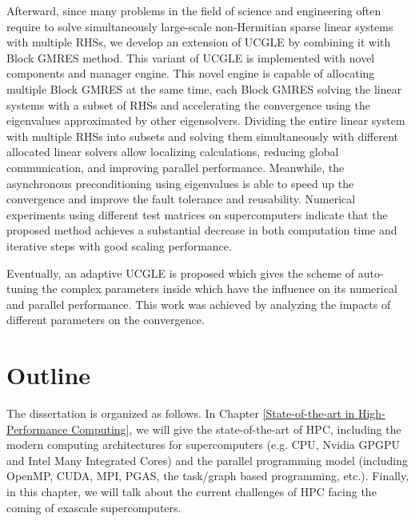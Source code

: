 Afterward, since many problems in the field of science and engineering often require to solve simultaneously large-scale non-Hermitian sparse linear systems with multiple RHSs, we develop an extension of UCGLE by combining it with Block GMRES method. This variant of UCGLE is implemented with novel components and manager engine. This novel engine is capable of allocating multiple Block GMRES at the same time, each Block GMRES solving the linear systems with a subset of RHSs and accelerating the convergence using the eigenvalues approximated by other eigensolvers. Dividing the entire linear system with multiple RHSs into subsets and solving them simultaneously with different allocated linear solvers allow localizing calculations, reducing global communication, and improving parallel performance. Meanwhile, the asynchronous preconditioning using eigenvalues is able to speed up the convergence and improve the fault tolerance and reusability. Numerical experiments using different test matrices on supercomputers indicate that the proposed method achieves a substantial decrease in both computation time and iterative steps with good scaling performance.

Eventually, an adaptive UCGLE is proposed which gives the scheme of auto-tuning the complex parameters inside which have the influence on its numerical and parallel performance. This work was achieved by analyzing the impacts of different parameters on the convergence.

\section{Outline}

The dissertation is organized as follows. In Chapter \ref{State-of-the-art in High-Performance Computing}, we will give the state-of-the-art of HPC, including the modern computing architectures for supercomputers (e.g. CPU, Nvidia GPGPU and Intel Many Integrated Cores) and the parallel programming model (including OpenMP, CUDA, MPI, PGAS, the task/graph based programming, etc.). Finally, in this chapter, we will talk about the current challenges of HPC facing the coming of exascale supercomputers.

